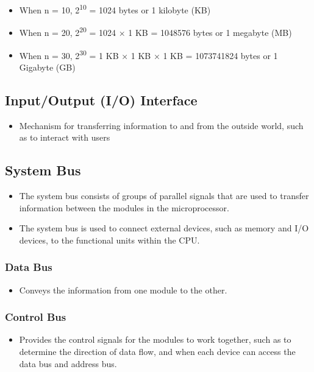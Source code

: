 \documentclass[11pt]{article}
\begin{document}
\begin{itemize}
\item When n = 10, 2\textsuperscript{10} = 1024 bytes or 1 kilobyte (KB)
\item When n = 20, 2\textsuperscript{20} = 1024 × 1 KB = 1048576 bytes or 1 megabyte (MB)
\item When n = 30, 2\textsuperscript{30} = 1 KB × 1 KB × 1 KB = 1073741824 bytes or 1 Gigabyte (GB)
\end{itemize}

\subsection{Input/Output (I/O) Interface}
\label{sec:orgdda5e3b}
\begin{itemize}
\item Mechanism for transferring information to and from the outside world, such as to interact with users
\end{itemize}

\subsection{System Bus}
\label{sec:org3387fe7}
\begin{itemize}
\item The system bus consists of groups of parallel signals that are used to transfer information between the modules in the microprocessor.
\item The system bus is used to connect external devices, such as memory and I/O devices, to the functional units within the CPU.
\end{itemize}

\subsubsection{Data Bus}
\label{sec:org98255c2}
\begin{itemize}
\item Conveys the information from one module to the other.
\end{itemize}

\subsubsection{Control Bus}
\label{sec:org372f4ca}
\begin{itemize}
\item Provides the control signals for the modules to work together, such as to determine the direction of data flow, and when each device can access the data bus and address bus.
\end{itemize}
\end{document}
